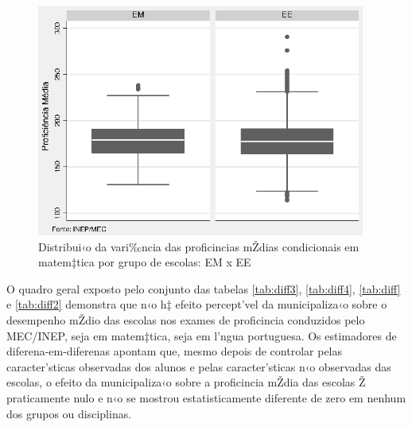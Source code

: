 \documentclass[a4paper, 12pt]{article}
\begin{document}




\begin{figure}[h]
\centering
\begin{footnotesize}
\caption{Distribui‹o da vari‰ncia das proficincias mŽdias condicionais em matem‡tica por grupo de escolas: EM x EE} 
\label{fig:EMEE}                             
 \includegraphics[height=3in]{EMEE}
\end{footnotesize}
\end{figure}
 


O quadro geral exposto pelo conjunto das tabelas \ref{tab:diff3}, \ref{tab:diff4}, \ref{tab:diff} e \ref{tab:diff2} demonstra que n‹o h‡ efeito percept’vel da municipaliza‹o sobre o desempenho mŽdio das escolas nos exames de proficincia conduzidos pelo MEC/INEP, seja em matem‡tica, seja em l’ngua portuguesa. Os estimadores de diferena-em-diferenas apontam que, mesmo depois de controlar pelas caracter’sticas observadas dos alunos e pelas caracter’sticas n‹o observadas das escolas, o efeito da municipaliza‹o sobre a proficincia mŽdia das escolas Ž praticamente nulo e n‹o se mostrou estatisticamente diferente de zero em nenhum dos grupos ou disciplinas.
\end{document}
